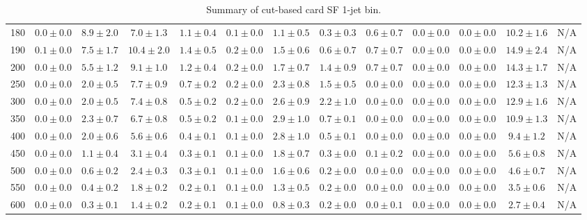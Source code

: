 \begin{table}
{\begin{center}
\begin{tabular}{l | c c | c c c c c c c c  | c c}
180 & $0.0\pm0.0$ & $8.9\pm2.0$ & $7.0\pm1.3$ & $1.1\pm0.4$ & $0.1\pm0.0$ & $1.1\pm0.5$ & $0.3\pm0.3$ & $0.6\pm0.7$ & $0.0\pm0.0$ & $0.0\pm0.0$ & $10.2\pm1.6$ & N/A \\ 
190 & $0.1\pm0.0$ & $7.5\pm1.7$ & $10.4\pm2.0$ & $1.4\pm0.5$ & $0.2\pm0.0$ & $1.5\pm0.6$ & $0.6\pm0.7$ & $0.7\pm0.7$ & $0.0\pm0.0$ & $0.0\pm0.0$ & $14.9\pm2.4$ & N/A \\
200 & $0.0\pm0.0$ & $5.5\pm1.2$ & $9.1\pm1.0$ & $1.2\pm0.4$ & $0.2\pm0.0$ & $1.7\pm0.7$ & $1.4\pm0.9$ & $0.7\pm0.7$ & $0.0\pm0.0$ & $0.0\pm0.0$ & $14.3\pm1.7$ & N/A \\ 
250 & $0.0\pm0.0$ & $2.0\pm0.5$ & $7.7\pm0.9$ & $0.7\pm0.2$ & $0.2\pm0.0$ & $2.3\pm0.8$ & $1.5\pm0.5$ & $0.0\pm0.0$ & $0.0\pm0.0$ & $0.0\pm0.0$ & $12.3\pm1.3$ & N/A \\ 
300 & $0.0\pm0.0$ & $2.0\pm0.5$ & $7.4\pm0.8$ & $0.5\pm0.2$ & $0.2\pm0.0$ & $2.6\pm0.9$ & $2.2\pm1.0$ & $0.0\pm0.0$ & $0.0\pm0.0$ & $0.0\pm0.0$ & $12.9\pm1.6$ & N/A \\ 
350 & $0.0\pm0.0$ & $2.3\pm0.7$ & $6.7\pm0.8$ & $0.5\pm0.2$ & $0.1\pm0.0$ & $2.9\pm1.0$ & $0.7\pm0.1$ & $0.0\pm0.0$ & $0.0\pm0.0$ & $0.0\pm0.0$ & $10.9\pm1.3$ & N/A \\ 
400 & $0.0\pm0.0$ & $2.0\pm0.6$ & $5.6\pm0.6$ & $0.4\pm0.1$ & $0.1\pm0.0$ & $2.8\pm1.0$ & $0.5\pm0.1$ & $0.0\pm0.0$ & $0.0\pm0.0$ & $0.0\pm0.0$ & $9.4\pm1.2$ & N/A \\ 
450 & $0.0\pm0.0$ & $1.1\pm0.4$ & $3.1\pm0.4$ & $0.3\pm0.1$ & $0.1\pm0.0$ & $1.8\pm0.7$ & $0.3\pm0.0$ & $0.1\pm0.2$ & $0.0\pm0.0$ & $0.0\pm0.0$ & $5.6\pm0.8$ & N/A \\ 
500 & $0.0\pm0.0$ & $0.6\pm0.2$ & $2.4\pm0.3$ & $0.3\pm0.1$ & $0.1\pm0.0$ & $1.6\pm0.6$ & $0.2\pm0.0$ & $0.0\pm0.0$ & $0.0\pm0.0$ & $0.0\pm0.0$ & $4.6\pm0.7$ & N/A \\ 
550 & $0.0\pm0.0$ & $0.4\pm0.2$ & $1.8\pm0.2$ & $0.2\pm0.1$ & $0.1\pm0.0$ & $1.3\pm0.5$ & $0.2\pm0.0$ & $0.0\pm0.0$ & $0.0\pm0.0$ & $0.0\pm0.0$ & $3.5\pm0.6$ & N/A \\ 
600 & $0.0\pm0.0$ & $0.3\pm0.1$ & $1.4\pm0.2$ & $0.2\pm0.1$ & $0.1\pm0.0$ & $0.8\pm0.3$ & $0.2\pm0.0$ & $0.0\pm0.1$ & $0.0\pm0.0$ & $0.0\pm0.0$ & $2.7\pm0.4$ & N/A \\ 
\hline
\end{tabular}
\end{center}
}
\caption{Summary of cut-based card SF 1-jet bin.}
\end{table}
